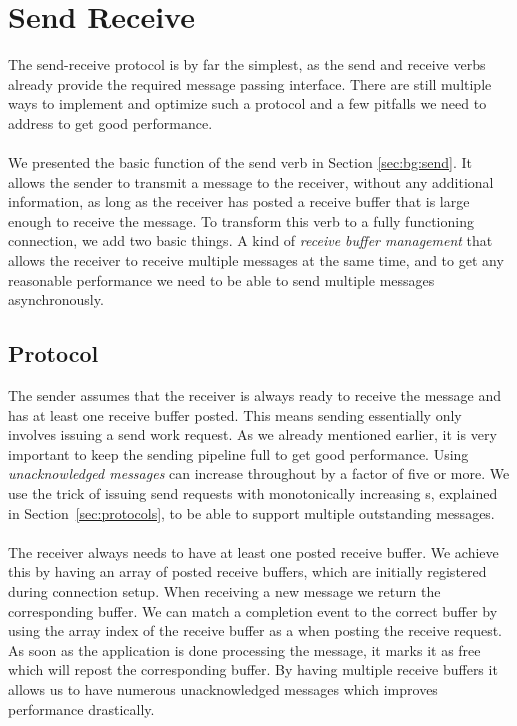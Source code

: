 \section{Send Receive} \label{sec:conn:send}\label{sendrcv}\label{sendrcv-design}

The send-receive protocol is by far the simplest, as the send and receive verbs already provide the required 
message passing interface. There are still multiple ways to implement and optimize such a protocol and a few pitfalls 
we need to address to get good performance.

\paragraph{} We presented the basic function of the send verb in Section \ref{sec:bg:send}. It allows the sender to transmit 
a message to the receiver, without any additional information, as long as the receiver has posted a receive buffer that is 
large enough to receive the message. To transform this verb to a fully functioning connection, we add two basic things. 
A kind of \emph{receive buffer management} that allows the receiver to receive multiple messages at the same time, 
and to get any reasonable performance we need to be able to send multiple messages asynchronously.

\subsection{Protocol} 

The sender assumes that the receiver is always ready to receive the message and has at least one receive buffer 
posted. This means sending essentially only involves issuing a send work request. As we already mentioned earlier, it is very 
important to keep the sending pipeline full to get good performance. Using \emph{unacknowledged messages} can increase
throughout by a factor of five or more.
We use the trick of issuing send requests with monotonically increasing s, explained in Section~\ref{sec:protocols},
to be able to support multiple 
outstanding messages.

\paragraph{} The receiver always needs to have at least one posted receive buffer. We achieve this by having an array of 
posted receive buffers, which are initially registered during connection setup. When receiving a new message we return 
the corresponding buffer. We can match a completion event to the correct buffer by using the array index of the receive 
buffer as a  when posting the receive request. As soon as the application is done processing the message,
it marks it as free which will repost the corresponding buffer. By having multiple receive buffers it allows us to have 
numerous unacknowledged messages which improves performance drastically.

